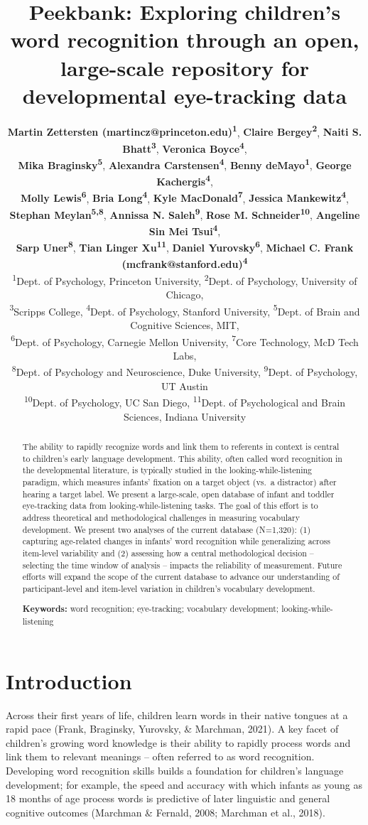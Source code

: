 \documentclass[10pt, letterpaper]{article}
\title{Peekbank: Exploring children's word recognition through an open,
large-scale repository for developmental eye-tracking data}
\author{{\large \bf Martin Zettersten (martincz@princeton.edu)\textsuperscript{1}}, {\large \bf Claire Bergey\textsuperscript{2}}, {\large \bf Naiti S. Bhatt\textsuperscript{3}}, {\large \bf Veronica Boyce\textsuperscript{4}},  \\ {\large \bf Mika Braginsky\textsuperscript{5}}, {\large \bf Alexandra Carstensen\textsuperscript{4}}, {\large \bf Benny deMayo\textsuperscript{1}}, {\large \bf George Kachergis\textsuperscript{4}},  \\ {\large \bf Molly Lewis\textsuperscript{6}}, {\large \bf Bria Long\textsuperscript{4}}, {\large \bf Kyle MacDonald\textsuperscript{7}}, {\large \bf Jessica Mankewitz\textsuperscript{4}},  \\ {\large \bf Stephan Meylan\textsuperscript{5,8}}, {\large \bf Annissa N. Saleh\textsuperscript{9}}, {\large \bf Rose M. Schneider\textsuperscript{10}}, {\large \bf Angeline Sin Mei Tsui\textsuperscript{4}},  \\ {\large \bf Sarp Uner\textsuperscript{8}}, {\large \bf Tian Linger Xu\textsuperscript{11}}, {\large \bf Daniel Yurovsky\textsuperscript{6}}, {\large \bf Michael C. Frank (mcfrank@stanford.edu)\textsuperscript{4}}  \\ {\textsuperscript{1}}Dept. of Psychology, Princeton University, {\textsuperscript{2}}Dept. of Psychology, University of Chicago,  \\ {\textsuperscript{3}}Scripps College, {\textsuperscript{4}}Dept. of Psychology, Stanford University, {\textsuperscript{5}}Dept. of Brain and Cognitive Sciences, MIT,  \\ {\textsuperscript{6}}Dept. of Psychology, Carnegie Mellon University, {\textsuperscript{7}}Core Technology, McD Tech Labs,  \\ {\textsuperscript{8}}Dept. of Psychology and Neuroscience, Duke University, {\textsuperscript{9}}Dept. of Psychology, UT Austin \\ {\textsuperscript{10}}Dept. of Psychology, UC San Diego, {\textsuperscript{11}}Dept. of Psychological and Brain Sciences, Indiana University}
\begin{document}
\maketitle

\begin{abstract}
The ability to rapidly recognize words and link them to referents in
context is central to children's early language development. This
ability, often called word recognition in the developmental literature,
is typically studied in the looking-while-listening paradigm, which
measures infants' fixation on a target object (vs.~a distractor) after
hearing a target label. We present a large-scale, open database of
infant and toddler eye-tracking data from looking-while-listening tasks.
The goal of this effort is to address theoretical and methodological
challenges in measuring vocabulary development. We present two analyses
of the current database (N=1,320): (1) capturing age-related changes in
infants' word recognition while generalizing across item-level
variability and (2) assessing how a central methodological decision --
selecting the time window of analysis -- impacts the reliability of
measurement. Future efforts will expand the scope of the current
database to advance our understanding of participant-level and
item-level variation in children's vocabulary development.

\textbf{Keywords:}
word recognition; eye-tracking; vocabulary development;
looking-while-listening
\end{abstract}

\hypertarget{introduction}{%
\section{Introduction}\label{introduction}}

Across their first years of life, children learn words in their native
tongues at a rapid pace (Frank, Braginsky, Yurovsky, \& Marchman, 2021).
A key facet of children's growing word knowledge is their ability to
rapidly process words and link them to relevant meanings -- often
referred to as word recognition. Developing word recognition skills
builds a foundation for children's language development; for example,
the speed and accuracy with which infants as young as 18 months of age
process words is predictive of later linguistic and general cognitive
outcomes (Marchman \& Fernald, 2008; Marchman et al., 2018).
\end{document}
